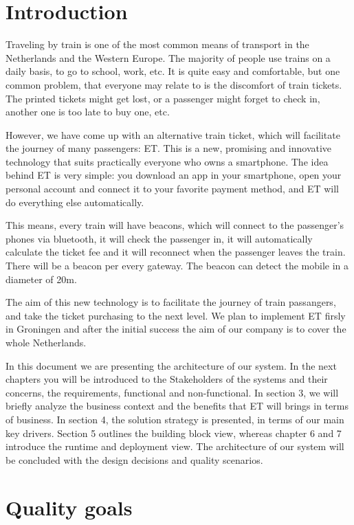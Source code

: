 \section{Introduction}
Traveling by train is one of the most common means of transport in the Netherlands and the Western Europe. The majority of people use trains on a daily basis, to go to school, work, etc. It is quite easy and comfortable, but one common problem, that everyone may relate to is the discomfort of train tickets. The printed tickets might get lost, or a passenger might forget to check in, another one is too late to buy one, etc. 

However, we have come up with an alternative train ticket, which will facilitate the journey of many passengers: \ac{ET}. This is a new, promising and innovative technology that suits practically everyone who owns a smartphone. The idea  behind \ac{ET} is very simple: you download an app in your smartphone, open your personal account and connect it to your favorite payment method, and \ac{ET} will do everything else automatically. 

This means, every train will have beacons, which will connect to the passenger’s phones via  bluetooth, it will check the passenger in,  it will automatically calculate the ticket fee and it will reconnect  when the passenger leaves the train. There will be a beacon per every gateway. The beacon can detect the mobile in a diameter of 20m.

The aim of this new technology is to facilitate the journey of train passangers, and take the ticket purchasing to the next level. We plan to implement \ac{ET} firsly in Groningen and after the initial success the aim of our company is to cover the whole Netherlands. 

In this document we are presenting the architecture of our system. In the next chapters you will be introduced to the Stakeholders of the systems and their concerns, the requirements, functional and non-functional.  In section 3, we will briefly analyze the business context and the benefits that \ac{ET} will brings in terms of business. In section 4, the solution strategy is presented, in terms of our main key drivers. Section 5 outlines the building block view, whereas chapter 6 and 7 introduce the runtime and deployment view. The architecture of our system will be concluded with the design decisions and quality scenarios. 

\section{Quality goals}

